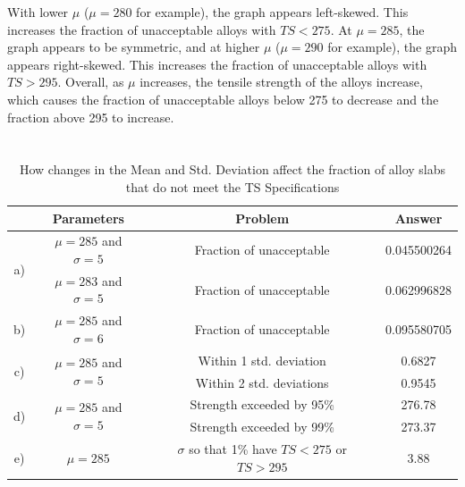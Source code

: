 \documentclass[letterpaper]{article}
\begin{document}
With lower $\mu$ ($\mu=280$ for example), the graph appears left-skewed. This
increases the fraction of unacceptable alloys with $TS < 275$. At $\mu=285$, the
graph appears to be symmetric, and at higher $\mu$ ($\mu=290$ for example), the
graph appears right-skewed. This increases the fraction of unacceptable alloys
with $TS > 295$. Overall, as $\mu$ increases, the tensile strength of the alloys
increase, which causes the fraction  of unacceptable alloys below 275 to
decrease and the fraction above 295 to increase.


\section{} %

\begin{table}[H]
 \centering
 \begin{tabular}{c|c|c|c|}
                      & Parameters                                & Problem                                            & Answer      \\ \hline
  \multirow{2}{*}{a)} & $\mu=285$ and $\sigma=5$                  & Fraction of unacceptable                           & 0.045500264 \\ \cline{2-4}
                      & $\mu=283$ and $\sigma=5$                  & Fraction of unacceptable                           & 0.062996828 \\ \hline
  b)                  & $\mu=285$ and $\sigma=6$                  & Fraction of unacceptable                           & 0.095580705 \\ \hline
  \multirow{2}{*}{c)} & \multirow{2}{*}{$\mu=285$ and $\sigma=5$} & Within 1 std. deviation                            & 0.6827      \\ \cline{3-4}
                      &                                           & Within 2 std. deviations                           & 0.9545      \\ \hline
  \multirow{2}{*}{d)} & \multirow{2}{*}{$\mu=285$ and $\sigma=5$} & Strength exceeded by 95\%                          & 276.78      \\ \cline{3-4}
                      &                                           & Strength exceeded by 99\%                          & 273.37      \\ \hline
  e)                  & $\mu=285$                                 & $\sigma$ so that 1\% have $TS < 275$ or $TS > 295$ & 3.88        \\ \hline
 \end{tabular}
 \caption{How changes in the Mean and Std. Deviation affect the fraction of alloy slabs that do not meet the TS Specifications}
 \label{q2}
\end{table}
\end{document}
